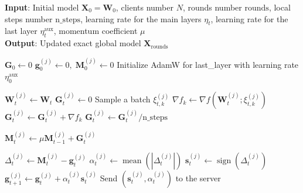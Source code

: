 \documentclass[letterpaper]{article} %
\begin{document}
\begin{algorithm}[!t]
\caption{Federated EF21-MuonUDSign}
\label{ef21_ud_alg}
\textbf{Input}: Initial model $\mathbf{X}_0=\mathbf{W}_0$, clients number $N$, rounds number $\mathrm{rounds}$, local steps number $\mathrm{n\_steps}$, learning rate for the main layers $\eta_t$, learning rate for the last layer $\eta_t^{\text{aux}}$,  momentum coefficient $\mu$ \\
\textbf{Output}: Updated exact global model $\mathbf{X}_{\mathrm{rounds}}$
\begin{algorithmic}[1]
\State $\mathbf{G}_0 \gets 0$ 
    \State $\mathbf{g}_0^{(j)} \gets 0, \; \mathbf{M}_0^{(j)} \gets 0$ 
\EndFor
\State Initialize AdamW for last\_layer with learning rate $\eta^{\mathrm{aux}}_0$

     
        \State $\mathbf{W}_t^{(j)} \gets \mathbf{W}_t$ 
        \State $\mathbf{G}_t^{(j)} \gets 0$
            \State Sample a batch $\xi_{t,k}^{(j)}$
            \State $\nabla f_k \gets \nabla f(\mathbf{W}_t^{(j)}; \xi_{t,k}^{(j)})$
            \State $\mathbf{G}_t^{(j)} \gets \mathbf{G}_t^{(j)} + \nabla f_k$
        \EndFor
        \State $\mathbf{G}_t^{(j)} \gets \mathbf{G}_t^{(j)} / \mathrm{n\_steps}$ 

        \State $\mathbf{M}_t^{(j)} \gets \mu \mathbf{M}_{t-1}^{(j)} + \mathbf{G}_t^{(j)}$ 

            \State $\Delta_t^{(j)} \gets \mathbf{M}_t^{(j)} - \mathbf{g}_t^{(j)}$ 
            \State $\alpha_t^{(j)} \gets \operatorname{mean}(|\Delta_t^{(j)}|)$ 
            \State $\mathbf{s}_t^{(j)} \gets \operatorname{sign}(\Delta_t^{(j)})$ 
            \State $\mathbf{g}_{t+1}^{(j)} \gets \mathbf{g}_t^{(j)} + \alpha_t^{(j)} \mathbf{s}_t^{(j)}$ 
            \State Send $(\mathbf{s}_t^{(j)}, \alpha_t^{(j)})$ to the server
        \EndFor


\end{algorithmic}
\end{algorithm}
\end{document}
